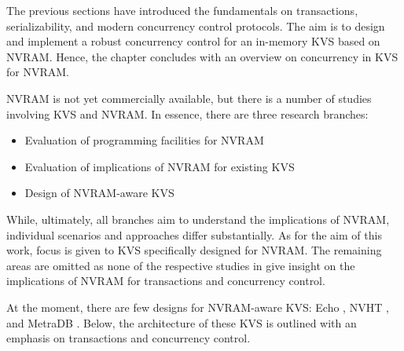 The previous sections have introduced the fundamentals on transactions,
serializability, and modern concurrency control protocols. The aim is to design
and implement a robust concurrency control for an in-memory \ac{KVS} based on
\ac{NVRAM}. Hence, the chapter concludes with an overview on concurrency in
\ac{KVS} for \ac{NVRAM}.

\ac{NVRAM} is not yet commercially available, but there is a number of studies
involving \ac{KVS} and \ac{NVRAM}. In essence, there are three research
branches:

\begin{itemize}
    \item Evaluation of programming facilities for \ac{NVRAM}
    \item Evaluation of implications of \ac{NVRAM} for existing \ac{KVS}
    \item Design of \ac{NVRAM}-aware \ac{KVS}
\end{itemize}

While, ultimately, all branches aim to understand the implications of
\ac{NVRAM}, individual scenarios and approaches differ substantially. As for the
aim of this work, focus is given to \ac{KVS} specifically designed for
\ac{NVRAM}. The remaining areas are omitted as none of the respective studies in
\cite{venkataraman2011consistent, pelley2013storage, volos2014aerie,
lersch2017analysis, malinowski2017using} give insight on the implications of
\ac{NVRAM} for transactions and concurrency control.



At the moment, there are few designs for \ac{NVRAM}-aware \ac{KVS}: Echo
\cite{bailey2013exploring}, NVHT \cite{zhou2016nvht}, and MetraDB
\cite{marmol2016nonvolatile}. Below, the architecture of these \ac{KVS} is
outlined with an emphasis on transactions and concurrency control.

